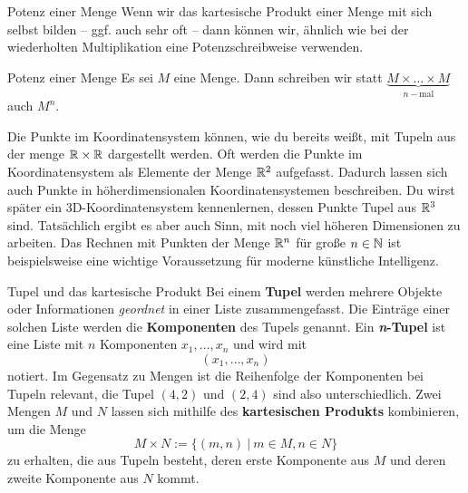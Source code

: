 \documentclass[../../main.tex]{subfiles}
\begin{document}
\begin{advanced}{Potenz einer Menge}
    Wenn wir das kartesische Produkt einer Menge mit sich selbst bilden -- ggf. auch sehr oft -- dann können wir, ähnlich wie bei der wiederholten Multiplikation eine Potenzschreibweise verwenden.

    \begin{definition}{Potenz einer Menge}
        Es sei $M$ eine Menge. Dann schreiben wir statt $\underbrace{M\times \dots\times M}_{n-\text{mal}}$ auch $M^n$.
    \end{definition}

    Die Punkte im Koordinatensystem können, wie du bereits weißt, mit Tupeln aus der menge $\mathbb{R}\times\mathbb{R}$ dargestellt werden. Oft werden die Punkte im Koordinatensystem als Elemente der Menge $\mathbb{R}^2$ aufgefasst. Dadurch lassen sich auch Punkte in höherdimensionalen Koordinatensystemen beschreiben. Du wirst später ein 3D-Koordinatensystem kennenlernen, dessen Punkte Tupel aus $\mathbb{R}^3$ sind. Tatsächlich ergibt es aber auch Sinn, mit noch viel höheren Dimensionen zu arbeiten. Das Rechnen mit Punkten der Menge $\mathbb{R}^n$ für große $n\in\mathbb{N}$ ist beispielsweise eine wichtige Voraussetzung für moderne künstliche Intelligenz.
\end{advanced}
\fi
\begin{nutshell}{Tupel und das kartesische Produkt}
    Bei einem \textbf{Tupel} werden mehrere Objekte oder Informationen \emph{geordnet} in einer Liste zusammengefasst. Die Einträge einer solchen Liste werden die \textbf{Komponenten} des Tupels genannt. Ein \textbf{\emph{n}-Tupel} ist eine Liste mit $n$ Komponenten $x_1,\dots,x_n$ und wird mit \[(x_1,\dots,x_n)\] 
    notiert. Im Gegensatz zu Mengen ist die Reihenfolge der Komponenten bei Tupeln relevant, die Tupel $(4,2)$ und $(2,4)$ sind also unterschiedlich. Zwei Mengen $M$ und $N$ lassen sich mithilfe des \textbf{kartesischen Produkts} kombinieren, um die Menge 
    \[M\times N:=\{(m,n)~|~m\in M, n\in N\}\]
    zu erhalten, die aus Tupeln besteht, deren erste Komponente aus $M$ und deren zweite Komponente aus $N$ kommt.
\end{nutshell}
\end{document}
